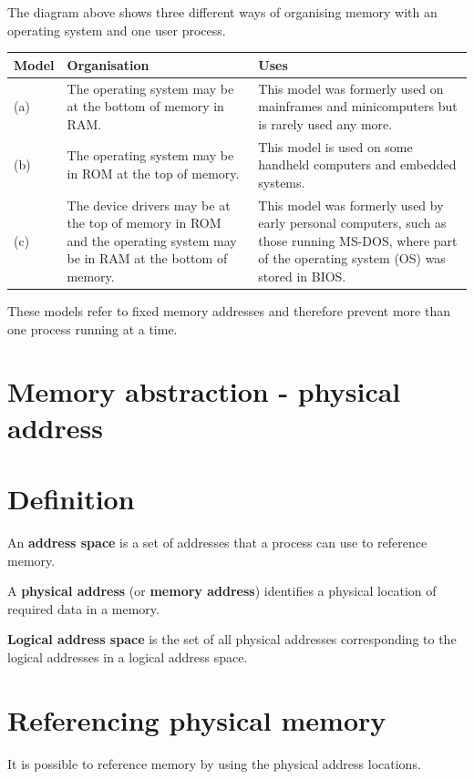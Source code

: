 \documentclass[a4paper]{systems-software}
\begin{document}
The diagram above shows three different ways of organising memory with an operating system and one user process.

\begin{longtabu} to \textwidth {| X[1,l] | X[6,l] | X[6,l] | }
    \hline
    \textbf{Model} & \textbf{Organisation} & \textbf{Uses} 
	\\ \hline
	(a) & The operating system may be at the bottom of memory in RAM.
	& This model was formerly used on mainframes and minicomputers but is rarely used any more.
	\\ \hline
	(b) & The operating system may be in ROM at the top of memory.
	& This model is used on some handheld computers and embedded systems. 
	\\ \hline
	(c) & The device drivers may be at the top of memory in ROM and the operating system may be in RAM at the bottom of memory.
	& This model was formerly used by early personal computers, such as those running MS-DOS, where part of the operating system (OS) was stored in BIOS.
	\\ \hline
\end{longtabu}

These models refer to fixed memory addresses and therefore prevent more than one process running at a time.


\section{Memory abstraction - physical address}

\section*{Definition}

An \textbf{address space} is a set of addresses that a process can use to reference memory.

A \textbf{physical address} (or \textbf{memory address}) identifies a physical location of required data in a memory.

\textbf{Logical address space} is the set of all physical addresses corresponding to the logical addresses in a logical address space.


\section*{Referencing physical memory}

It is possible to reference memory by using the physical address locations.
\end{document}

